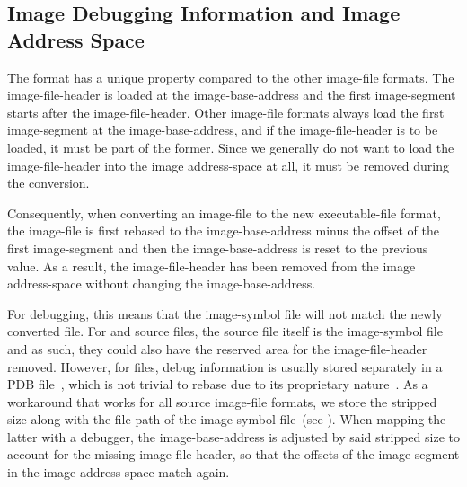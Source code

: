 \subsection{Image Debugging Information and Image Address Space}

The  format has a unique property compared to the other \gls{image-file} formats. The \gls{image-file-header} is loaded at the \gls{image-base-address} and the first \gls{image-segment} starts after the \gls{image-file-header}. Other \gls{image-file} formats always load the first \gls{image-segment} at the \gls{image-base-address}, and if the \gls{image-file-header} is to be loaded, it must be part of the former. Since we generally do not want to load the \gls{image-file-header} into the \gls{image} \gls{address-space} at all, it must be removed during the conversion.

Consequently, when converting an \gls{image-file} to the new \gls{executable-file} format, the \gls{image-file} is first rebased to the \gls{image-base-address} minus the offset of the first \gls{image-segment} and then the \gls{image-base-address} is reset to the previous value. As a result, the \gls{image-file-header} has been removed from the \gls{image} \gls{address-space} without changing the \gls{image-base-address}.

For debugging, this means that the \gls{image-symbol} file will not match the newly converted file. For  and  source files, the source file itself is the \gls{image-symbol} file and as such, they could also have the reserved area for the \gls{image-file-header} removed. However, for  files, debug information is usually stored separately in a \gls{PDB} file~\cite{pdb-doc}, which is not trivial to rebase due to its proprietary nature~\cite{pdb-doc-deprecation}. As a workaround that works for all source \gls{image-file} formats, we store the stripped size along with the file path of the \gls{image-symbol} file~(see ). When mapping the latter with a debugger, the \gls{image-base-address} is adjusted by said stripped size to account for the missing \gls{image-file-header}, so that the offsets of the \gls{image-segment} in the \gls{image} \gls{address-space} match again.

